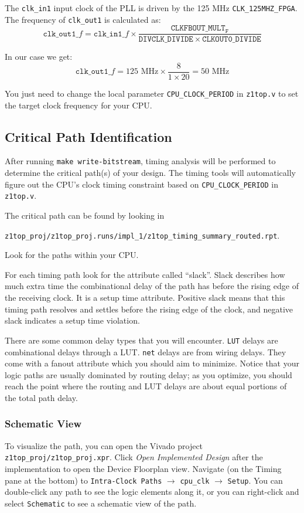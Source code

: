 \documentclass[11pt]{article}
\begin{document}
The \verb|clk_in1| input clock of the PLL is driven by the 125 MHz \verb|CLK_125MHZ_FPGA|.
The frequency of \verb|clk_out1| is calculated as:
\begin{equation*}
  \mathtt{clk\_out1}\_f = \mathtt{clk\_in1}\_f \times \frac{\mathtt{CLKFBOUT\_MULT_F}}{\mathtt{DIVCLK\_DIVIDE} \times \mathtt{CLKOUT0\_DIVIDE}}
\end{equation*}

In our case we get:
\begin{equation*}
  \mathtt{clk\_out1}\_f = 125 \text{ MHz} \times \frac{8}{1 \times 20} = 50 \text{ MHz}
\end{equation*}

You just need to change the local parameter \verb|CPU_CLOCK_PERIOD| in \verb|z1top.v| to set the target clock frequency for your CPU.

\subsection{Critical Path Identification}
After running \verb|make write-bitstream|, timing analysis will be performed to determine the critical path(s) of your design.
The timing tools will automatically figure out the CPU's clock timing constraint based on \verb|CPU_CLOCK_PERIOD| in \verb|z1top.v|.

The critical path can be found by looking in

\verb|z1top_proj/z1top_proj.runs/impl_1/z1top_timing_summary_routed.rpt|.

Look for the paths within your CPU.

For each timing path look for the attribute called ``slack''.
Slack describes how much extra time the combinational delay of the path has before the rising edge of the receiving clock.
It is a setup time attribute.
Positive slack means that this timing path resolves and settles before the rising edge of the clock, and negative slack indicates a setup time violation.

There are some common delay types that you will encounter.
\verb|LUT| delays are combinational delays through a LUT.
\verb|net| delays are from wiring delays. They come with a fanout attribute which you should aim to minimize.
Notice that your logic paths are usually dominated by routing delay; as you optimize, you should reach the point where the routing and LUT delays are about equal portions of the total path delay.

\subsubsection{Schematic View}
To visualize the path, you can open the Vivado project \verb|z1top_proj/z1top_proj.xpr|.
Click \textit{Open Implemented Design} after the implementation to open the Device Floorplan view.
Navigate (on the Timing pane at the bottom) to \verb|Intra-Clock Paths| $\rightarrow$ \verb|cpu_clk| $\rightarrow$ \verb|Setup|.
You can double-click any path to see the logic elements along it, or you can right-click and select \verb|Schematic| to see a schematic view of the path.
\end{document}
